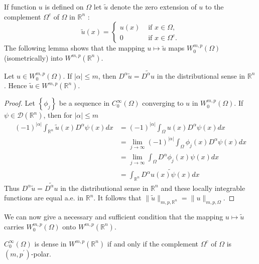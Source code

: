 \begin{para}
  If function $u$ is defined on $\Omega$ let $\tilde{u}$ denote the zero extension of $u$
  to the complement $\Omega^c$ of $\Omega$ in $\mathbb{R}^n$ :
  \[
  \tilde{u}(x)= \begin{cases}u(x) & \text { if } x \in \Omega, \\ 0 & \text { if } x \in \Omega^c .\end{cases}
  \]
  The following lemma shows that the mapping $u \mapsto \tilde{u}$
  maps $W_0^{m, p}(\Omega)$ (isometrically) into $W^{m,p}\left(\mathbb{R}^n\right)$.
\end{para}

\begin{lemma}
  Let $u \in W_0^{m, p}(\Omega)$. If $|\alpha| \leq m$,
  then $D^\alpha \tilde{u}=\widetilde{D^\alpha u}$ in the distributional sense in $\mathbb{R}^n$. 
  Hence $\tilde{u} \in W^{m, p}\left(\mathbb{R}^n\right)$.
\end{lemma}

\begin{proof}
  Let $\left\{\phi_j\right\}$ be a sequence in $C_0^{\infty}(\Omega)$ converging to $u$ in $W_0^{m, p}(\Omega)$. If $\psi \in \mathscr{D}\left(\mathbb{R}^n\right)$, then for $|\alpha| \leq m$
  \[
  \begin{aligned}
  (-1)^{|\alpha|} \int_{\mathbb{R}^n} \tilde{u}(x) D^\alpha \psi(x) d x & =(-1)^{|\alpha|} \int_{\Omega} u(x) D^\alpha \psi(x) d x \\
  & =\lim _{j \rightarrow \infty}(-1)^{|\alpha|} \int_{\Omega} \phi_j(x) D^\alpha \psi(x) d x \\
  & =\lim _{j \rightarrow \infty} \int_{\Omega} D^\alpha \phi_j(x) \psi(x) d x \\
  & =\int_{\mathbb{R}^n} \widetilde{D^\alpha u(x) \psi(x) d x}
  \end{aligned}
  \]
  Thus $D^\alpha \tilde{u}=\widetilde{D^\alpha u}$ in the distributional sense
  in $\mathbb{R}^n$ and these locally integrable functions are equal a.e. in $\mathbb{R}^n$.
  It follows that $\|\tilde{u}\|_{m, p, \mathbb{R}^n}=\|u\|_{m, p, \Omega}$.
\end{proof}

We can now give a necessary and sufficient condition that the mapping $u \mapsto \tilde{u}$ 
carries $W_0^{m, p}(\Omega)$ onto $W^{m,p}\left(\mathbb{R}^n\right)$.

\begin{theorem}
  $C_0^{\infty}(\Omega)$ is dense in $W^{m,p}\left(\mathbb{R}^n\right)$ if and only if the 
  complement $\Omega^c$ of $\Omega$ is $\left(m, p^{\prime}\right)$-polar.
\end{theorem}

